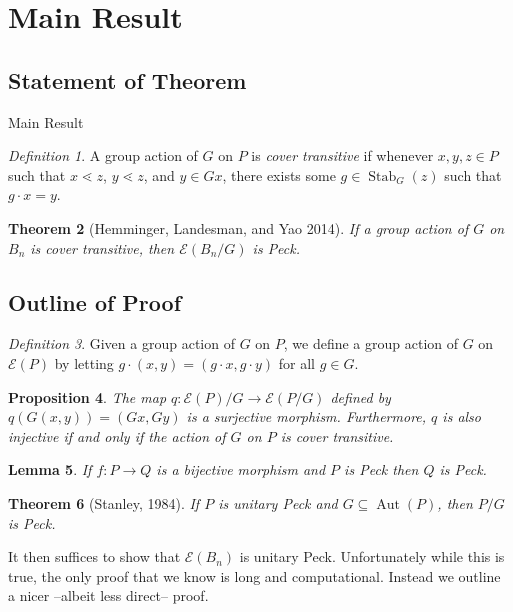 \documentclass{beamer}
\newtheorem{thm}{Theorem}
\newtheorem{lem}[thm]{Lemma}
\newtheorem{prop}[thm]{Proposition}
\theoremstyle{remark}
\newtheorem{defn}[thm]{Definition}
\def\Stab{\operatorname{Stab}}
\begin{document}
\section{Main Result}
\subsection{Statement of Theorem}

\begin{frame}{Main Result}
\begin{defn}
A group action of $G$ on $P$ is \textit{cover transitive} if whenever $x,y,z\in P$ such that $x\lessdot z$, $y\lessdot z$, and $y\in Gx$, there exists some $g\in \Stab_G(z)$ such that $g\cdot x = y$.
\end{defn}

\begin{thm}[Hemminger, Landesman, and Yao 2014]
If a group action of $G$ on $B_n$ is cover transitive, then $\mathcal{E}(B_n/G)$ is Peck.
\end{thm}
\end{frame}






\subsection{Outline of Proof}

\begin{frame}
\begin{defn}
Given a group action of $G$ on $P$, we define a group action of $G$ on $\mathcal{E}(P)$ by letting $g\cdot (x,y) = (g\cdot x,g\cdot y)$ for all $g\in G$.
\end{defn}
\pause
\begin{prop}
The map $q\colon \mathcal{E}(P)/G\rightarrow \mathcal{E}(P/G)$ defined by $q(G(x,y)) = (Gx,Gy)$ is a surjective morphism.  Furthermore, $q$ is also injective if and only if the action of $G$ on $P$ is cover transitive.
\end{prop}

\begin{lem}
If $f:P\rightarrow Q$ is a bijective morphism and $P$ is Peck then $Q$ is Peck.
\end{lem}
\end{frame}







\begin{frame}
\begin{thm}[Stanley, 1984]
If $P$ is unitary Peck and $G\subseteq\operatorname{Aut}(P)$, then $P/G$ is Peck.
\end{thm}
It then suffices to show that $\mathcal{E}(B_n)$ is unitary Peck.  Unfortunately while this is true, the only proof that we know is long and computational.  Instead we outline a nicer --albeit less direct-- proof.
\end{frame}
\end{document}
